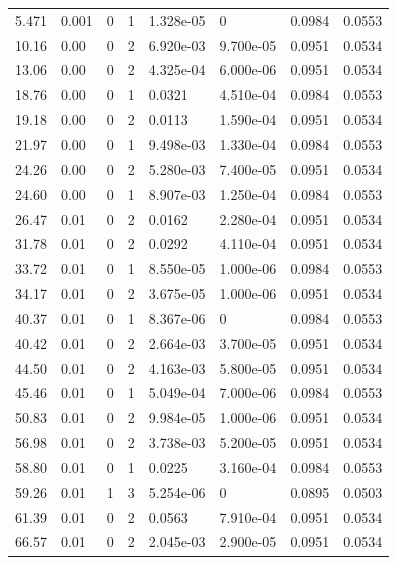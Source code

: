 \documentclass[preview]{standalone}
\begin{document}
{{\begin{tabular}{L{1.2cm}C{1.2cm} C{0.3cm}C{0.5cm} C{1.4cm}C{1.4cm} C{1.4cm}C{1.4cm}}
  5.471  &  0.001  & 0     &  1 &  1.328e-05  & 0  & 0.0984 &  0.0553   \\ 
  10.16  &  0.00  & 0     &  2 &  6.920e-03  & 9.700e-05  & 0.0951 &  0.0534   \\ 
  13.06  &  0.00  & 0     &  2 &  4.325e-04  & 6.000e-06  & 0.0951 &  0.0534   \\ 
  18.76  &  0.00  & 0     &  1 &  0.0321  & 4.510e-04  & 0.0984 &  0.0553   \\ 
  19.18  &  0.00  & 0     &  2 &  0.0113  & 1.590e-04  & 0.0951 &  0.0534   \\ 
  21.97  &  0.00  & 0     &  1 &  9.498e-03  & 1.330e-04  & 0.0984 &  0.0553   \\ 
  24.26  &  0.00  & 0     &  2 &  5.280e-03  & 7.400e-05  & 0.0951 &  0.0534   \\ 
  24.60  &  0.00  & 0     &  1 &  8.907e-03  & 1.250e-04  & 0.0984 &  0.0553   \\ 
  26.47  &  0.01  & 0     &  2 &  0.0162  & 2.280e-04  & 0.0951 &  0.0534   \\ 
  31.78  &  0.01  & 0     &  2 &  0.0292  & 4.110e-04  & 0.0951 &  0.0534   \\ 
  33.72  &  0.01  & 0     &  1 &  8.550e-05  & 1.000e-06  & 0.0984 &  0.0553   \\ 
  34.17  &  0.01  & 0     &  2 &  3.675e-05  & 1.000e-06  & 0.0951 &  0.0534   \\ 
  40.37  &  0.01  & 0     &  1 &  8.367e-06  & 0  & 0.0984 &  0.0553   \\ 
  40.42  &  0.01  & 0     &  2 &  2.664e-03  & 3.700e-05  & 0.0951 &  0.0534   \\ 
  44.50  &  0.01  & 0     &  2 &  4.163e-03  & 5.800e-05  & 0.0951 &  0.0534   \\ 
  45.46  &  0.01  & 0     &  1 &  5.049e-04  & 7.000e-06  & 0.0984 &  0.0553   \\ 
  50.83  &  0.01  & 0     &  2 &  9.984e-05  & 1.000e-06  & 0.0951 &  0.0534   \\ 
  56.98  &  0.01  & 0     &  2 &  3.738e-03  & 5.200e-05  & 0.0951 &  0.0534   \\ 
  58.80  &  0.01  & 0     &  1 &  0.0225  & 3.160e-04  & 0.0984 &  0.0553   \\ 
  59.26  &  0.01  & 1     &  3 &  5.254e-06  & 0  & 0.0895 &  0.0503   \\ 
  61.39  &  0.01  & 0     &  2 &  0.0563  & 7.910e-04  & 0.0951 &  0.0534   \\ 
  66.57  &  0.01  & 0     &  2 &  2.045e-03  & 2.900e-05  & 0.0951 &  0.0534   \\ 

\end{tabular}}}
\end{document}
